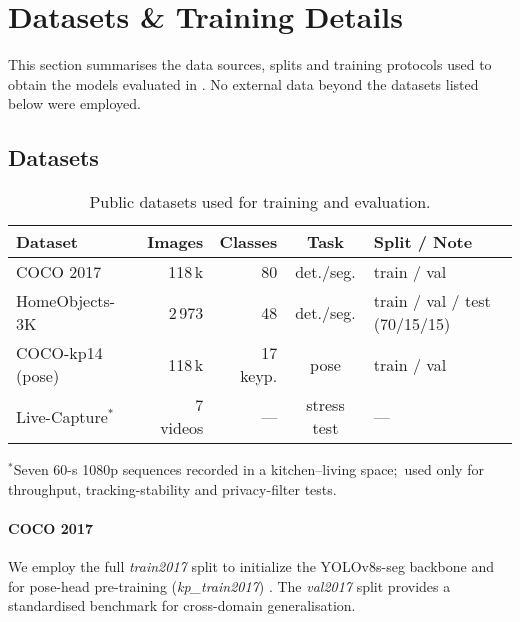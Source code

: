 \section{Datasets \& Training Details}
\label{sec:data-train}

This section summarises the data sources, splits and training protocols
used to obtain the models evaluated in .  
No external data beyond the datasets listed below were employed.

\subsection{Datasets}
\begin{table}[ht]
    \small
    \setlength{\tabcolsep}{3pt}
    \caption{Public datasets used for training and evaluation.}
    \label{tab:datasets}
    \begin{tabularx}{\linewidth}{@{}l r r c >{\raggedright\arraybackslash}X@{}}
      \toprule
      \textbf{Dataset} & \textbf{Images} & \textbf{Classes} & \textbf{Task} & \textbf{Split / Note}\\
      \midrule
      COCO 2017                & 118\,k & 80 & det./seg. & train / val \cite{lin2014microsoft} \\
      HomeObjects-3K           & 2\,973 & 48 & det./seg. & train / val / test (70/15/15) \cite{tangaro2025homeobjects3k} \\
      COCO-kp14 (pose)         & 118\,k & 17 keyp. & pose & train / val \cite{lin2014microsoft} \\
      Live-Capture$^{*}$       & 7 videos & — & stress test & — \\
      \bottomrule
    \end{tabularx}
    \vspace{0.3em}
    \footnotesize\raggedright
    $^{*}$Seven 60-s 1080p sequences recorded in a kitchen--living space;\
    used only for throughput, tracking-stability and privacy-filter tests.
\end{table}

\paragraph*{COCO 2017} We employ the full \textit{train2017} split to
initialize the YOLOv8s-seg backbone and for pose-head pre-training
(\textit{kp\_train2017}) \cite{lin2014microsoft}. The \textit{val2017}
split provides a standardised benchmark for cross-domain generalisation.

